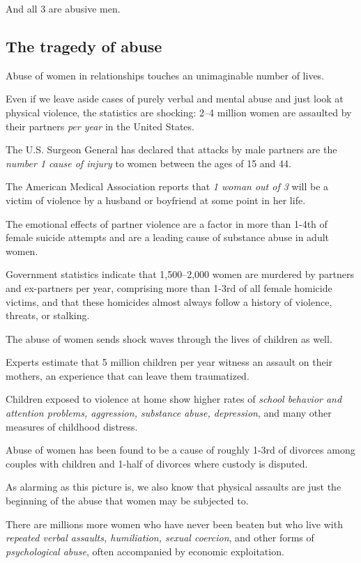 \documentclass[oneside]{article}
\numberwithin{equation}{section}
\begin{document}
And all 3 are abusive men.

\subsection{The tragedy of abuse}
Abuse of women in relationships touches an unimaginable number of lives.

Even if we leave aside cases of purely verbal and mental abuse and just look at physical violence, the statistics are shocking: 2--4 million women are assaulted by their partners \textit{per year} in the United States.

The U.S. Surgeon General has declared that attacks by male partners are the \textit{number 1 cause of injury} to women between the ages of 15 and 44.

The American Medical Association reports that \textit{1 woman out of 3} will be a victim of violence by a husband or boyfriend at some point in her life.

The emotional effects of partner violence are a factor in more than 1-4th of female suicide attempts and are a leading cause of substance abuse in adult women.

Government statistics indicate that 1,500--2,000 women are murdered by partners and ex-partners per year, comprising more than 1-3rd of all female homicide victims, and that these homicides almost always follow a history of violence, threats, or stalking.

%
The abuse of women sends shock waves through the lives of children as well.

Experts estimate that 5 million children per year witness an assault on their mothers, an experience that can leave them traumatized.

Children exposed to violence at home show higher rates of \textit{school behavior and attention problems, aggression, substance abuse, depression}, and many other measures of childhood distress.

Abuse of women has been found to be a cause of roughly 1-3rd of divorces among couples with children and 1-half of divorces where custody is disputed.

%
As alarming as this picture is, we also know that physical assaults are just the beginning of the abuse that women may be subjected to.

There are millions more women who have never been beaten but who live with \textit{repeated verbal assaults, humiliation, sexual coercion}, and other forms of \textit{psychological abuse}, often accompanied by economic exploitation.
\end{document}
